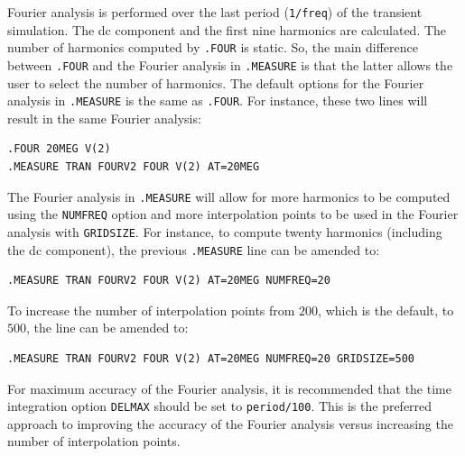 Fourier analysis is performed over the last period (\texttt{1/freq}) of 
the transient simulation.  The dc component and the first nine harmonics are calculated.
The number of harmonics computed by \texttt{.FOUR} is static.  So, the
main difference between \texttt{.FOUR} and the Fourier analysis in \texttt{.MEASURE} is that the latter allows the user to select the number of harmonics.  
The default options for the Fourier analysis in \texttt{.MEASURE} 
is the same as \texttt{.FOUR}.  For instance, these two lines will result in the 
same Fourier analysis:

\begin{verbatim}
.FOUR 20MEG V(2)
.MEASURE TRAN FOURV2 FOUR V(2) AT=20MEG
\end{verbatim}


The Fourier analysis in \texttt{.MEASURE} will allow for more harmonics
to be computed using the \texttt{NUMFREQ} option and more interpolation points
to be used in the Fourier analysis with \texttt{GRIDSIZE}.  
For instance, to compute twenty harmonics
(including the dc component), the previous \texttt{.MEASURE} line can be amended to:

\begin{verbatim}
.MEASURE TRAN FOURV2 FOUR V(2) AT=20MEG NUMFREQ=20
\end{verbatim}

To increase the number of interpolation points from $200$, which is the default,
to $500$, the line can be amended to:

\begin{verbatim}
.MEASURE TRAN FOURV2 FOUR V(2) AT=20MEG NUMFREQ=20 GRIDSIZE=500
\end{verbatim}

For maximum accuracy of the Fourier analysis, it is recommended that 
the time integration option \texttt{DELMAX}
should be set to \texttt{period/100}.  This is the preferred approach to
improving the accuracy of the Fourier analysis versus increasing the number of
interpolation points.

